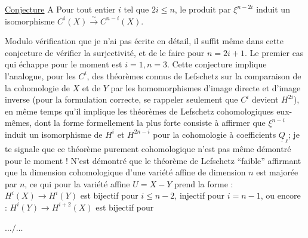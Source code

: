 \uline{Conjecture} A Pour tout entier $i$ tel que $2i\leq n$, le produit par $\xi^{n-2i}$ induit un isomorphisme $C^i(X)\xrightarrow{\sim}C^{n-i}(X)$.

Modulo vérification que je n'ai pas écrite en détail, il suffit même dans cette conjecture de vérifier la surjectivité, et de le faire pour $n=2i+1$. Le premier cas qui échappe pour le moment est $i=1,n=3$. Cette conjecture implique l'analogue, pour les $C^i$, des théorèmes connus de Lefschetz sur la comparaison de la cohomologie de $X$ et de $Y$ par les homomorphismes d'image directe et d'image inverse (pour la formulation correcte, se rappeler seulement que $C^i$ devient $H^{2i}$), en même temps qu'il implique les théorèmes de Lefschetz cohomologiques eux-mêmes, dont la forme formellement la plus forte consiste à affirmer que $\xi^{n-i}$ induit un isomorphisme de $H^i$ et $H^{2n-i}$ pour la cohomologie à coefficients $\underline{Q}_\ell$; je te signale que ce théorème purement cohomologique n'est pas même démontré pour le moment ! N'est démontré que le théorème de Lefschetz ``faible'' affirmant que la dimension cohomologique d'une variété affine de dimension $n$ est majorée par $n$, ce qui pour la variété affine $U=X-Y$ prend la forme : $H^i(X)\longrightarrow H^i(Y)$ est bijectif pour $i\leq n-2$, injectif pour $i=n-1$, ou encore : $H^i(Y)\longrightarrow H^{i+2}(X)$ est bijectif pour

\hfill $\ldots/\ldots$

